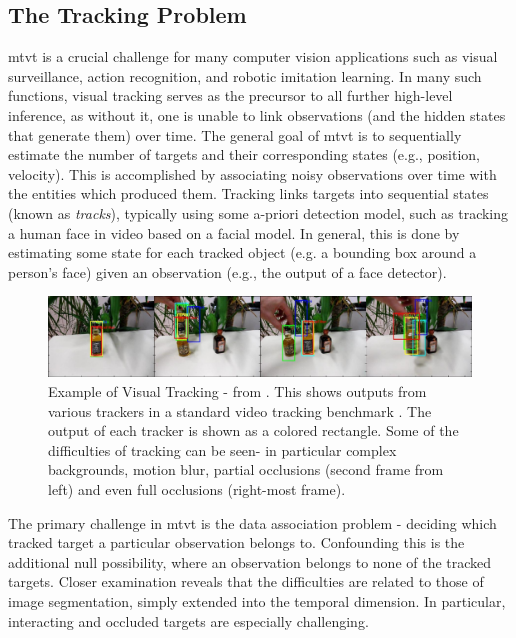 \subsection{The Tracking Problem}
\gls{mtvt} is a crucial challenge for many computer vision applications such as visual surveillance, action recognition, and robotic imitation learning. In many such functions, visual tracking serves as the precursor to all further high-level inference, as without it, one is unable to link observations (and the hidden states that generate them) over time. The general goal of \gls{mtvt} is to sequentially estimate the number of targets and their corresponding states (e.g., position, velocity). This is accomplished by associating noisy observations over time with the entities which produced them. Tracking links targets into sequential states (known as \emph{tracks}), typically using some a-priori detection model, such as tracking a human face in video based on a facial model. In general, this is done by estimating some state for each tracked object (e.g. a bounding box around a person's face) given an observation (e.g., the output of a face detector).

\begin{figure}
\label{fig:ExampleTracking}
\centering
\includegraphics[width=\linewidth]{figures/Introduction/Tracking_Example.pdf}
\caption[Example of Visual Tracking]{Example of Visual Tracking - from \cite{PartFilter_Papon_2012}. This shows outputs from various trackers in a standard video tracking benchmark \cite{PROST}. The output of each tracker is shown as a colored rectangle. Some of the difficulties of tracking can be seen- in particular complex backgrounds, motion blur, partial occlusions (second frame from left) and even full occlusions (right-most frame).}
\end{figure}

The primary challenge in \gls{mtvt} is the data association problem - deciding which tracked target a particular observation belongs to. Confounding this is the additional null possibility, where an observation belongs to none of the tracked targets. Closer examination reveals that the difficulties are related to those of image segmentation, simply extended into the temporal dimension. In particular, interacting and occluded targets are especially challenging.

